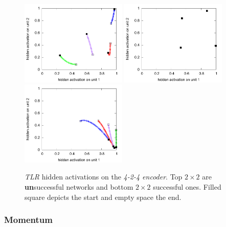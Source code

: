 \begin{figure}[H]
  \includegraphics[width=0.45\textwidth]{img/hid-tlr-good-tiny.pdf}  
  \includegraphics[width=0.45\textwidth]{img/hid-tlr-good-init.pdf}  
  \includegraphics[width=0.45\textwidth]{img/hid-tlr-good-weird.pdf}  
  \caption{\emph{TLR} hidden activations on the \emph{4-2-4 encoder}. Top $2\times2$ are {\bf un}successful networks and bottom $2\times2$ successful ones. Filled square depicts the start and empty space the end.}
  \label{fig:results-hidden-activations-tlr}
\end{figure}

\subsubsection{Momentum}
\label{sec:results-momentum} 

